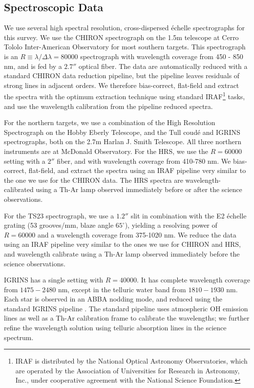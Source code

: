 \documentclass{emulateapj}
\begin{document}
\subsection{Spectroscopic Data}
\label{subsec:specdata}
We use several high spectral resolution, cross-dispersed \'echelle spectrographs for this survey. We use the CHIRON spectrograph \citep{CHIRON} on the 1.5m telescope at Cerro Tololo Inter-American Observatory for most southern targets. This spectrograph is an $R\equiv \lambda / \Delta \lambda = 80000$ spectrograph with wavelength coverage from 450 - 850 nm, and is fed by a $2.7''$ optical fiber. The data are automatically reduced with a standard CHIRON data reduction pipeline, but the pipeline leaves residuals of strong lines in adjacent orders. We therefore bias-correct, flat-field and extract the spectra with the optimum extraction technique \citep{Horne1986} using standard IRAF\footnote{IRAF is distributed by the National Optical Astronomy Observatories, which are operated by the Association of Universities for Research in Astronomy, Inc., under cooperative agreement with the National Science Foundation.} tasks, and use the wavelength calibration from the pipeline reduced spectra.

For the northern targets, we use a combination of the High Resolution Spectrograph \citep[HRS,][]{HRS} on the Hobby Eberly Telescope, and the Tull coud\'e \citep[TS23,][]{TS23} and IGRINS \citep{IGRINS} spectrographs, both on the 2.7m Harlan J. Smith Telescope. All three northern instruments are at McDonald Observatory. For the HRS, we use the $R = 60000$ setting with a $2''$ fiber, and with wavelength coverage from 410-780 nm. We bias-correct, flat-field, and extract the spectra using an IRAF pipeline very similar to the one we use for the CHIRON data. The HRS spectra are wavelength-calibrated using a Th-Ar lamp observed immediately before or after the science observations.

For the TS23 spectrograph, we use a $1.2''$ slit in combination with the E2 \'echelle grating (53 grooves/mm, blaze angle $65^{\circ}$), yielding a resolving power of $R=60000$ and a wavelength coverage from 375-1020 nm. We reduce the data using an IRAF pipeline very similar to the ones we use for CHIRON and HRS, and wavelength calibrate using a Th-Ar lamp observed immediately before the science observations.

IGRINS has a single setting with $R = 40000$. It has complete wavelength coverage from $1475-2480$ nm, except in the telluric water band from $1810 - 1930$ nm. Each star is observed in an ABBA nodding mode, and reduced using the standard IGRINS pipeline \citep{IGRINS_plp_v2}. The standard pipeline uses atmospheric OH emission lines as well as a Th-Ar calibration frame to calibrate the wavelengths; we further refine the wavelength solution using telluric absorption lines in the science spectrum.
\end{document}
